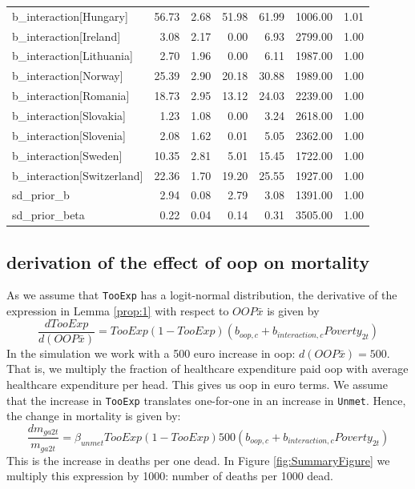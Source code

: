 \documentclass[a4paper,12pt]{article}
\begin{document}
\begin{table}[htbp]
\begin{tabular}{lrrrrrr}
b\_interaction[Hungary] & 56.73 & 2.68 & 51.98 & 61.99 & 1006.00 & 1.01\\
b\_interaction[Ireland] & 3.08 & 2.17 & 0.00 & 6.93 & 2799.00 & 1.00\\
b\_interaction[Lithuania] & 2.70 & 1.96 & 0.00 & 6.11 & 1987.00 & 1.00\\
b\_interaction[Norway] & 25.39 & 2.90 & 20.18 & 30.88 & 1989.00 & 1.00\\
b\_interaction[Romania] & 18.73 & 2.95 & 13.12 & 24.03 & 2239.00 & 1.00\\
b\_interaction[Slovakia] & 1.23 & 1.08 & 0.00 & 3.24 & 2618.00 & 1.00\\
b\_interaction[Slovenia] & 2.08 & 1.62 & 0.01 & 5.05 & 2362.00 & 1.00\\
b\_interaction[Sweden] & 10.35 & 2.81 & 5.01 & 15.45 & 1722.00 & 1.00\\
b\_interaction[Switzerland] & 22.36 & 1.70 & 19.20 & 25.55 & 1927.00 & 1.00\\
sd\_prior\_b & 2.94 & 0.08 & 2.79 & 3.08 & 1391.00 & 1.00\\
sd\_prior\_beta & 0.22 & 0.04 & 0.14 & 0.31 & 3505.00 & 1.00\\
\end{tabular}
\end{table}


\subsection{derivation of the effect of oop on mortality}
\label{sec:org6762e20}

As we assume that \texttt{TooExp} has a logit-normal distribution, the derivative of the expression in Lemma \ref{prop:1} with respect to \(OOP \bar{x}\) is given by
\begin{equation}
\frac{dTooExp}{d(OOP \bar{x})} = TooExp(1-TooExp) (b_{oop,c} + b_{interaction,c} Poverty_{2t})
\end{equation}
In the simulation we work with a 500 euro increase in oop: \(d(OOP \bar{x})=500\). That is, we multiply the fraction of healthcare expenditure paid oop with average healthcare expenditure per head. This gives us oop in euro terms. We assume that the increase in \texttt{TooExp} translates one-for-one in an increase in \texttt{Unmet}. Hence, the change in mortality is given by:
\begin{equation}
\label{eq:effect_per_1000}
\frac{dm_{ga2t}}{m_{ga2t}} = \beta_{unmet} TooExp(1-TooExp) 500 (b_{oop,c} + b_{interaction,c} Poverty_{2t})
\end{equation}
This is the increase in deaths per one dead. In Figure \ref{fig:SummaryFigure} we multiply this expression by 1000: number of deaths per 1000 dead.
\end{document}
